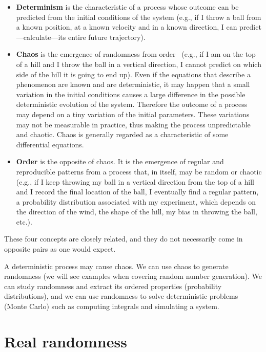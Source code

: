\documentclass[justified,sixbynine]{tufte-book}
\theoremstyle{plain}%
\theoremstyle{definition}
\theoremstyle{remark}
\begin{document}
\begin{fullwidth}
\begin{itemize}
\item  {\bf Determinism} is the characteristic of a process whose outcome
can be predicted from the initial conditions of the system (e.g., if I throw a
ball from a known position, at a known velocity and in a known direction, I
can predict---calculate---its entire future trajectory).

\item  {\bf Chaos} is the emergence of randomness from order~\cite{lorenz}
(e.g., if I am on the
top of a hill and I throw the ball in a vertical direction, I cannot predict on
which side of the hill it is going to end up). Even if the equations that
describe a phenomenon are known and are deterministic, it may happen that a
small variation in the initial conditions causes a large difference in the
possible deterministic evolution of the system. Therefore the outcome of a
process may depend on a tiny variation of the initial parameters. These
variations may not be measurable in practice, thus making the process
unpredictable and chaotic. Chaos is generally regarded as a characteristic
of some differential equations.

\item  {\bf Order} is the opposite of chaos. It is the emergence of regular
and reproducible patterns from a process that, in itself, may be random or
chaotic (e.g., if I keep throwing my ball in a vertical direction from
the top of a hill and I record the final location of the ball, I eventually
find a regular pattern, a probability distribution associated with my
experiment, which depends on the direction of the wind, the shape of the
hill, my bias in throwing the ball, etc.).
\end{itemize}

These four concepts are closely related, and they do not necessarily come in
opposite pairs as one would expect.

A deterministic process may cause chaos. We can use chaos to generate
randomness (we will see examples when covering random number generation). We
can study randomness and extract its ordered properties (probability
distributions), and we can use randomness to solve deterministic problems
(Monte Carlo) such as computing integrals and simulating a system.

\goodbreak\section{Real randomness}


\end{fullwidth}
\end{document}
